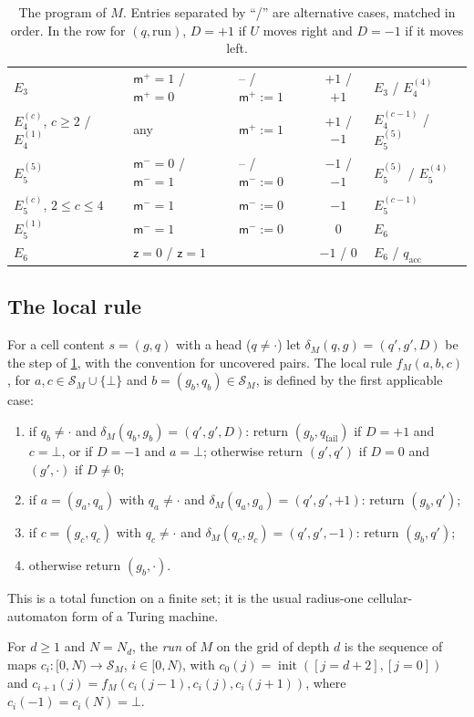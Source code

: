\begin{table}[ht]
\begin{tabularx}{\textwidth}{@{}l>{\raggedright\arraybackslash}X>{\raggedright\arraybackslash}p{2.6cm}c>{\raggedright\arraybackslash}p{2.5cm}@{}}
$E_3$ & $\mathsf m^+=1$ / $\mathsf m^+=0$ & -- / $\mathsf m^+:=1$ & $+1$ / $+1$ & $E_3$ / $E_4^{(4)}$\\
$E_4^{(c)}$, $c\ge2$ / $E_4^{(1)}$ & any & $\mathsf m^+:=1$ & $+1$ / $-1$ & $E_4^{(c-1)}$ / $E_5^{(5)}$\\
$E_5^{(5)}$ & $\mathsf m^-=0$ / $\mathsf m^-=1$ & -- / $\mathsf m^-:=0$ & $-1$ / $-1$ & $E_5^{(5)}$ / $E_5^{(4)}$\\
$E_5^{(c)}$, $2\le c\le4$ & $\mathsf m^-=1$ & $\mathsf m^-:=0$ & $-1$ & $E_5^{(c-1)}$\\
$E_5^{(1)}$ & $\mathsf m^-=1$ & $\mathsf m^-:=0$ & $0$ & $E_6$\\
$E_6$ & $\mathsf z=0$ / $\mathsf z=1$ & & $-1$ / $0$ & $E_6$ / $q_{\mathrm{acc}}$\\
\bottomrule
\end{tabularx}
\caption{The program of $M$. Entries separated by ``/'' are alternative cases, matched in order. In the row for $(q,\mathrm{run})$, $D=+1$ if $U$ moves right and $D=-1$ if it moves left.}
\label{tab:program}
\end{table}

\subsection{The local rule}

For a cell content $s=(g,q)$ with a head ($q\ne\cdot$) let $\delta_M(q,g)=(q',g',D)$ be the step of \cref{tab:program}, with the convention for uncovered pairs. The local rule $f_M(a,b,c)$, for $a,c\in\mathcal S_M\cup\{\bot\}$ and $b=(g_b,q_b)\in\mathcal S_M$, is defined by the first applicable case:
\begin{enumerate}[label=(\arabic*)]
\item if $q_b\ne\cdot$ and $\delta_M(q_b,g_b)=(q',g',D)$: return $(g_b,q_{\mathrm{fail}})$ if $D=+1$ and $c=\bot$, or if $D=-1$ and $a=\bot$; otherwise return $(g',q')$ if $D=0$ and $(g',\cdot)$ if $D\ne0$;
\item if $a=(g_a,q_a)$ with $q_a\ne\cdot$ and $\delta_M(q_a,g_a)=(q',g',+1)$: return $(g_b,q')$;
\item if $c=(g_c,q_c)$ with $q_c\ne\cdot$ and $\delta_M(q_c,g_c)=(q',g',-1)$: return $(g_b,q')$;
\item otherwise return $(g_b,\cdot)$.
\end{enumerate}
This is a total function on a finite set; it is the usual radius-one cellular-automaton form of a Turing machine.

\begin{definition}\label{mach:def-run}
For $d\ge1$ and $N=N_d$, the \emph{run} of $M$ on the grid of depth $d$ is the sequence of maps $c_i\colon[0,N)\to\mathcal S_M$, $i\in[0,N)$, with $c_0(j)=\operatorname{init}([j=d+2],[j=0])$ and $c_{i+1}(j)=f_M(c_i(j-1),c_i(j),c_i(j+1))$, where $c_i(-1)=c_i(N)=\bot$.
\end{definition}

